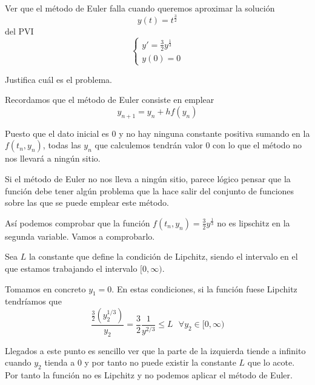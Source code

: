 \begin{problem}[2]
Ver que el método de Euler falla cuando queremos aproximar la solución
\[y(t) = t^{\frac{3}{2}}\]
del PVI
\[\left\{ \begin{array}{l}y'=\frac{3}{2}y^{\frac{1}{3}} \\
y(0)=0\end{array}
\right.\]

Justifica cuál es el problema.

\solution
{}

Recordamos que el método de Euler consiste en emplear
\[y_{n+1} = y_n + h f(y_n)\]

Puesto que el dato inicial es 0 y no hay ninguna constante positiva sumando en la $f(t_n,y_n)$, todas las $y_n$ que calculemos tendrán valor 0 con lo que el método no nos llevará a ningún sitio.

Si el método de Euler no nos lleva a ningún sitio, parece lógico pensar que la función debe tener algún problema que la hace salir del conjunto de funciones sobre las que se puede emplear este método.

Así podemos comprobar que la función $f(t_n,y_n)=\frac{3}{2}y^{\frac{1}{3}}$ no es lipschitz en la segunda variable. Vamos a comprobarlo.

Sea $L$ la constante que define la condición de Lipchitz, siendo el intervalo en el que estamos trabajando el intervalo $[0, \infty)$. 

Tomamos en concreto $y_1=0$. En estas condiciones, si la función fuese Lipchitz tendríamos que 
\[\frac{\frac{3}{2}(y_2^{1/3})}{y_2} = \frac{3}{2}\frac{1}{y^{2/3}}\leq L \ \ \ \forall y_2 \in [0,\infty)\]

Llegados a este punto es sencillo ver que la parte de la izquierda tiende a infinito cuando $y_2$ tienda a 0 y por tanto no puede existir la constante $L$ que lo acote. Por tanto la función no es Lipchitz y no podemos aplicar el método de Euler.
\end{problem}

